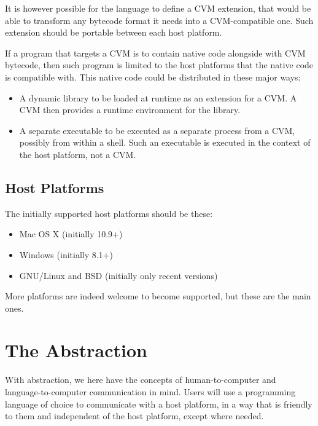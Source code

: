 It is however possible for the language to define a CVM extension, that would be able to transform any bytecode format it needs into a CVM-compatible one. Such extension should be portable between each host platform. 

If a program that targets a CVM is to contain native code alongside with CVM bytecode, then such program is limited to the host platforms that the native code is compatible with. This native code could be distributed in these major ways: 
\begin{itemize}
\item A dynamic library to be loaded at runtime as an extension for a CVM. A CVM then provides a runtime environment for the library. 
\item A separate executable to be executed as a separate process from a CVM, possibly from within a shell. Such an executable is executed in the context of the host platform, not a CVM. 
\end{itemize}





\section{Host Platforms}

The initially supported host platforms should be these:
\begin{itemize}
\item Mac OS X (initially 10.9+)
\item Windows (initially 8.1+)
\item GNU/Linux and BSD (initially only recent versions)
\end{itemize}

More platforms are indeed welcome to become supported, but these are the main ones. 






\chapter{The Abstraction}

With abstraction, we here have the concepts of human-to-computer and language-to-computer communication in mind. Users will use a programming language of choice to communicate with a host platform, in a way that is friendly to them and independent of the host platform, except where needed. 







